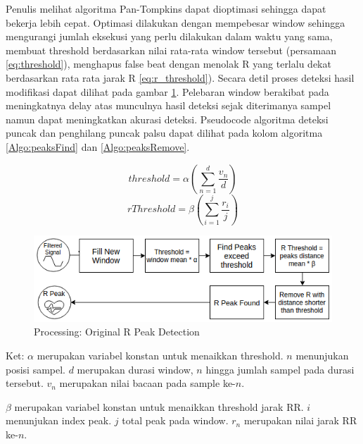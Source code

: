 Penulis melihat algoritma Pan-Tompkins dapat dioptimasi sehingga dapat bekerja lebih cepat. Optimasi dilakukan dengan mempebesar window sehingga mengurangi jumlah eksekusi yang perlu dilakukan dalam waktu yang sama, membuat threshold berdasarkan nilai rata-rata window tersebut (persamaan \ref{eq:threshold}), menghapus false beat dengan menolak R yang terlalu dekat berdasarkan rata rata jarak R \ref{eq:r_threshold}). Secara detil proses deteksi hasil modifikasi dapat dilihat pada gambar \ref{fig:processing_modif}. Pelebaran window berakibat pada meningkatnya delay atas munculnya hasil deteksi sejak diterimanya sampel namun dapat meningkatkan akurasi deteksi. Pseudocode algoritma deteksi puncak dan penghilang puncak palsu dapat dilihat pada kolom algoritma \ref{Algo:peaksFind} dan \ref{Algo:peaksRemove}.

\begin{equation}
threshold = \alpha (\sum_{n=1}^{d} \frac{v_{n}}{d})
\label{eq:threshold} 
\end{equation}
\begin{equation}
rThreshold = \beta (\sum_{i=1}^{j} \frac{r_{i}}{j})
\label{eq:r_threshold} 
\end{equation}

\begin{figure}[htbp]
\centerline{\includegraphics[scale=0.65]{images/processing_modif.png}}
\caption{Processing: Original R Peak Detection}
\label{fig:processing_modif}
\end{figure}

Ket:
$\alpha$ merupakan variabel konstan untuk menaikkan threshold. $n$ menunjukan posisi sampel. $d$ merupakan durasi window, $n$ hingga jumlah sampel pada durasi tersebut. $v_{n}$ merupakan nilai bacaan pada sample ke-$n$.

$\beta$ merupakan variabel konstan untuk menaikkan threshold jarak RR. $i$ menunjukan index peak. $j$ total peak pada window. $r_{n}$ merupakan nilai jarak RR ke-$n$.

